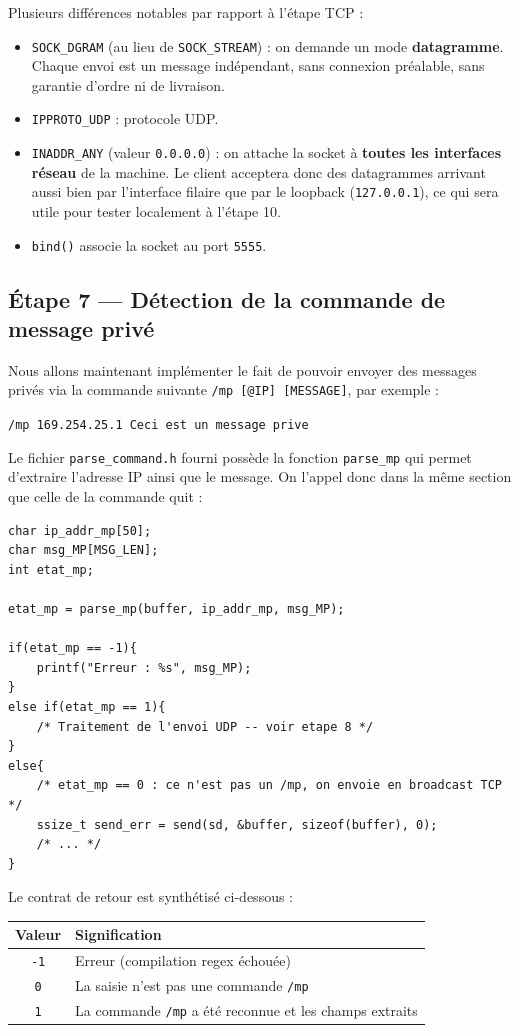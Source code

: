 \documentclass[a4paper,12pt,french]{article}
\begin{document}
Plusieurs différences notables par rapport à l'étape TCP :
\begin{itemize}
    \item \texttt{SOCK\_DGRAM} (au lieu de \texttt{SOCK\_STREAM}) : on demande un mode
    \textbf{datagramme}. Chaque envoi est un message indépendant, sans connexion préalable,
    sans garantie d'ordre ni de livraison.
    \item \texttt{IPPROTO\_UDP} : protocole UDP.
    \item \texttt{INADDR\_ANY} (valeur \texttt{0.0.0.0}) : on attache la socket à
    \textbf{toutes les interfaces réseau} de la machine. Le client acceptera donc des
    datagrammes arrivant aussi bien par l'interface filaire que par le loopback
    (\texttt{127.0.0.1}), ce qui sera utile pour tester localement à l'étape 10.
    \item \texttt{bind()} associe la socket au port \texttt{5555}.
\end{itemize}

\pagebreak
\subsection{Étape 7 — Détection de la commande de message privé}

Nous allons maintenant implémenter le fait de pouvoir envoyer des messages privés via la commande suivante \texttt{/mp [@IP] [MESSAGE]}, par exemple :
\begin{center}
    \texttt{/mp 169.254.25.1 Ceci est un message prive}
\end{center}

Le fichier \texttt{parse\_command.h} fourni possède la fonction \texttt{parse\_mp} qui permet d'extraire l'adresse IP ainsi que le message. On l'appel donc dans la même section que celle de la commande quit :

\begin{verbatim}
char ip_addr_mp[50];
char msg_MP[MSG_LEN];
int etat_mp;

etat_mp = parse_mp(buffer, ip_addr_mp, msg_MP);

if(etat_mp == -1){
    printf("Erreur : %s", msg_MP);
}
else if(etat_mp == 1){
    /* Traitement de l'envoi UDP -- voir etape 8 */
}
else{
    /* etat_mp == 0 : ce n'est pas un /mp, on envoie en broadcast TCP */
    ssize_t send_err = send(sd, &buffer, sizeof(buffer), 0);
    /* ... */
}
\end{verbatim}

Le contrat de retour est synthétisé ci-dessous :
\begin{center}
\begin{tabular}{c|l}
\textbf{Valeur} & \textbf{Signification} \\
\hline
\texttt{-1} & Erreur (compilation regex échouée) \\
\texttt{0}  & La saisie n'est pas une commande \texttt{/mp} \\
\texttt{1}  & La commande \texttt{/mp} a été reconnue et les champs extraits \\
\end{tabular}
\end{center}
\end{document}
